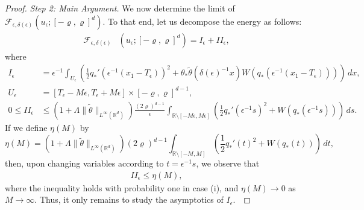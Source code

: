 \documentclass[10pt,a4paper]{amsart}
\begin{document}
\begin{proof}
	\textit{Step 2: Main Argument.} We now determine the limit of $\mathscr{F}_{\epsilon,\delta(\epsilon)}(u_{\epsilon} ; [-\varrho,\varrho]^{d})$.  To that end, let us decompose the energy as follows:
		\begin{align*}
			\mathscr{F}_{\epsilon,\delta(\epsilon)} &(u_{\epsilon}; [-\varrho,\varrho]^{d}) = I_{\epsilon} + II_{\epsilon}, 
		\end{align*}
	where
		\begin{align*}
			I_{\epsilon} &= \epsilon^{-1} \int_{U_{\epsilon}} \left( \frac{1}{2} q_* '(\epsilon^{-1}(x_{1} - T_{\epsilon}))^{2} + \theta_{*} \tilde{\theta}(\delta(\epsilon)^{-1} x) W(q_* (\epsilon^{-1}(x_{1} - T_{\epsilon}))) \right) \, dx, \\
			U_{\epsilon} &= [T_{\epsilon} - M \epsilon, T_{\epsilon} + M \epsilon] \times [- \varrho, \varrho]^{d - 1}, \\
			0 \leq II_{\epsilon} &\leq \left( 1 + \Lambda \|\tilde{\theta}\|_{L^{\infty}(\mathbb{R}^{d})} \right) \frac{ (2\varrho)^{d-1} }{ \epsilon } \int_{\mathbb{R} \setminus [- M \epsilon, M \epsilon]} \left( \frac{1}{2} q_{*} '( \epsilon^{-1} s )^{2} +W(q_{*} ( \epsilon^{-1} s )) \right) \,ds.
		\end{align*}
	If we define $\eta(M)$ by 
		\begin{equation*}
			\eta(M)  = \left( 1 + \Lambda \|\tilde{\theta}\|_{L^{\infty}(\mathbb{R}^{d})} \right) (2 \varrho)^{d-1} \int_{\mathbb{R} \setminus [-M,M]} \left(\frac{1}{2} q_{*} '(t)^{2} + W(q_{*} (t)) \right) \, dt,
		\end{equation*}
	then, upon changing variables according to $t = \epsilon^{-1} s$, we observe that 
		\begin{align*}
			II_{\epsilon} \leq \eta(M),
		\end{align*}
	where the inequality holds with probability one in case (i), and $\eta(M) \to 0$ as $M \to \infty$.  Thus, it only remains to study the asymptotics of $I_{\epsilon}$.\
	

\end{proof}
\end{document}
